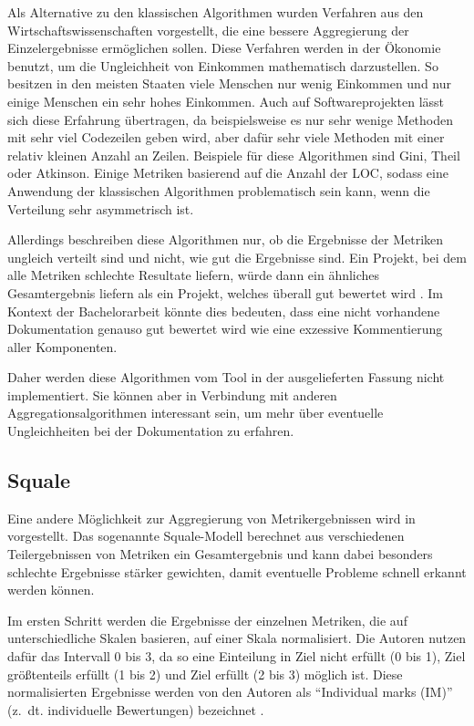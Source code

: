 Als Alternative zu den klassischen Algorithmen wurden Verfahren aus den Wirtschaftswissenschaften vorgestellt, die eine bessere Aggregierung der Einzelergebnisse ermöglichen sollen. Diese Verfahren werden in der Ökonomie benutzt, um die Ungleichheit von Einkommen mathematisch darzustellen. So besitzen in den meisten Staaten viele Menschen nur wenig Einkommen und nur einige Menschen ein sehr hohes Einkommen. Auch auf Softwareprojekten lässt sich diese Erfahrung übertragen, da beispielsweise es nur sehr wenige Methoden mit sehr viel Codezeilen geben wird, aber dafür sehr viele Methoden mit einer relativ kleinen Anzahl an Zeilen. Beispiele für diese Algorithmen sind Gini, Theil oder Atkinson. Einige Metriken  basierend auf die Anzahl der \ac{LOC}, sodass eine Anwendung der klassischen Algorithmen problematisch sein kann, wenn die Verteilung sehr asymmetrisch ist. \cite[S. 314]{Youcantcontroltheunfamiliar:Astudyontherelationsbetweenaggregationtechniquesforsoftwaremetrics} 
 
 Allerdings beschreiben diese Algorithmen nur, ob die Ergebnisse der Metriken ungleich verteilt sind und nicht, wie gut die Ergebnisse sind. Ein Projekt, bei dem alle Metriken schlechte Resultate liefern, würde dann ein ähnliches Gesamtergebnis liefern als ein Projekt, welches überall gut bewertet wird \cite[S. 1121]{Softwarequalitymetricsaggregationinindustry}.  Im Kontext der Bachelorarbeit könnte dies bedeuten, dass eine nicht vorhandene Dokumentation genauso gut bewertet wird wie eine exzessive Kommentierung aller Komponenten. 
 
 Daher werden diese Algorithmen vom Tool in der ausgelieferten Fassung nicht implementiert. Sie können aber in Verbindung mit anderen Aggregationsalgorithmen interessant sein, um mehr über eventuelle Ungleichheiten bei der Dokumentation zu erfahren.
 
 \subsection{Squale}
 Eine andere Möglichkeit zur Aggregierung von Metrikergebnissen wird in \cite[S. 1124]{Softwarequalitymetricsaggregationinindustry} vorgestellt. Das sogenannte Squale-Modell berechnet aus verschiedenen Teilergebnissen von Metriken ein Gesamtergebnis und kann dabei besonders schlechte Ergebnisse stärker gewichten, damit eventuelle Probleme schnell erkannt werden können. 
 
 Im ersten Schritt werden die Ergebnisse der einzelnen Metriken, die auf unterschiedliche Skalen basieren, auf einer Skala normalisiert. Die Autoren nutzen dafür das Intervall 0 bis 3, da so eine Einteilung in Ziel nicht erfüllt (0 bis 1), Ziel größtenteils erfüllt (1 bis 2) und Ziel erfüllt (2 bis 3) möglich ist. Diese normalisierten Ergebnisse werden von den Autoren als \enquote{Individual marks (IM)} (z.~dt. individuelle Bewertungen) bezeichnet \cite[S. 142]{AnEmpiricalModelforContinuousandWeightedMetricAggregation}. 
 
